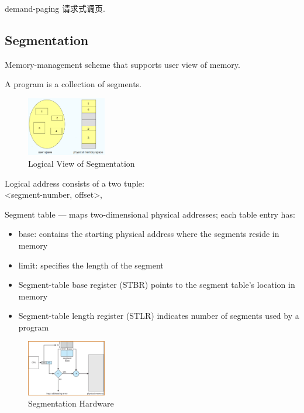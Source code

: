 demand-paging 请求式调页. 

\subsection{Segmentation}
Memory-management scheme that supports user view of memory. 

A program is a collection of segments.

\begin{figure}[!htb]
    \centering
    \includegraphics[width=0.309\textwidth]{pic/OS8/Logical View of Segmentation}
    \caption{Logical View of Segmentation}
\end{figure}

Logical address consists of a two tuple: \\
<segment-number, offset>,

Segment table --- maps two-dimensional physical addresses;
each table entry has:
\begin{itemize}
    \item base: contains the starting physical address where the
    segments reside in memory
    \item limit: specifies the length of the segment
\end{itemize}

\begin{itemize}\small
    \item Segment-table base register (STBR) points to the segment
    table's location in memory
    \item Segment-table length register (STLR) indicates number of
    segments used by a program
\end{itemize}

\begin{figure}[!htb]%
    \centering
    \includegraphics[width=0.309\textwidth]{pic/OS8/Segmentation Hardware}
    \caption{Segmentation Hardware}
\end{figure}
